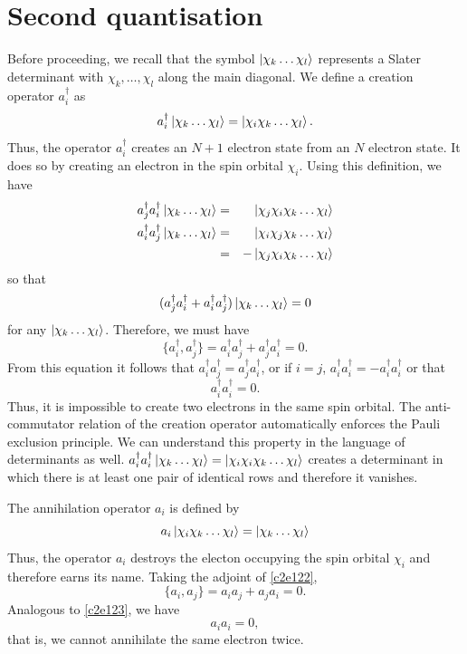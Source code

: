 \section{Second quantisation}
Before proceeding, we recall that the symbol $\ket{\chi_k\ldots\chi_l}$ 
represents a Slater determinant with $\chi_k, \ldots, \chi_l$ along the main
diagonal. We define a creation operator $a_i^\dagger$ as
\begin{equation}\label{c2e121}
a_i^\dagger\ket{\chi_k\ldots\chi_l} = \ket{\chi_i\chi_k\ldots\chi_l}.
\end{equation}
Thus, the operator $a_i^\dagger$ creates an $N+1$ electron state from an $N$
electron state. It does so by creating an electron in the spin orbital $\chi_i$.
Using this definition, we have
\begin{eqnarray*}
a_j^\dagger a_i^\dagger\ket{\chi_k\ldots\chi_l} &=& \ket{\chi_j\chi_i\chi_k
 \ldots\chi_l} \\
a_i^\dagger a_j^\dagger\ket{\chi_k\ldots\chi_l} &=& \ket{\chi_i\chi_j\chi_k
 \ldots\chi_l} \\
 &=& -\ket{\chi_j\chi_i\chi_k\ldots\chi_l}
\end{eqnarray*}
so that
\[
(a_j^\dagger a_i^\dagger + a_i^\dagger a_j^\dagger)\ket{\chi_k\ldots\chi_l}=0
\]
for any $\ket{\chi_k\ldots\chi_l}$. Therefore, we must have
\begin{equation}\label{c2e122}
\{a_i^\dagger, a_j^\dagger\} = a_i^\dagger a_j^\dagger + a_j^\dagger a_i^\dagger
= 0.
\end{equation}
From this equation it follows that $a_i^\dagger a_j^\dagger = a_j^\dagger 
a_i^\dagger$, or if $i=j$, $a_i^\dagger a_i^\dagger = -a_i^\dagger a_i^\dagger$
or that
\begin{equation}\label{c2e123}
a_i^\dagger a_i^\dagger = 0.
\end{equation}
Thus, it is impossible to create two electrons in the same spin orbital. The
anti-commutator relation of the creation operator automatically enforces the 
Pauli exclusion principle. We can understand this property in the language of
determinants as well. $a_i^\dagger a_i^\dagger \ket{\chi_k\ldots\chi_l} = 
\ket{\chi_i\chi_i\chi_k\ldots\chi_l}$ creates a determinant in which there is
at least one pair of identical rows and therefore it vanishes.

The annihilation operator $a_i$ is defined by
\begin{equation}\label{c2e124}
a_i\ket{\chi_i\chi_k\ldots\chi_l} = \ket{\chi_k\ldots\chi_l}
\end{equation}
Thus, the operator $a_i$ destroys the electon occupying the spin orbital 
$\chi_i$ and therefore earns its name. Taking the adjoint of \eqref{c2e122},
\begin{equation}\label{c2e125}
\{a_i, a_j\} = a_ia_j + a_ja_i = 0.
\end{equation}
Analogous to \eqref{c2e123}, we have
\begin{equation}\label{c2e126}
a_ia_i = 0,
\end{equation}
that is, we cannot annihilate the same electron twice.

